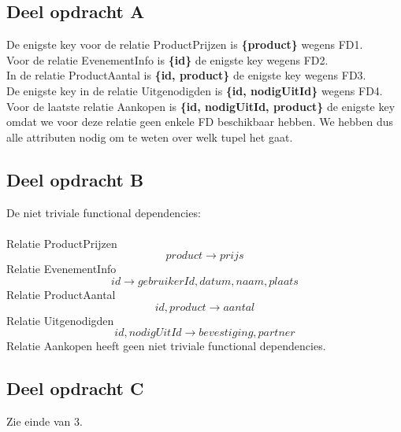 \documentclass[a4paper]{article}
\begin{document}
\subsection{Deel opdracht A}
De enigste key voor de relatie ProductPrijzen is \textbf{\{product\}} wegens FD1.\\
Voor de relatie EvenementInfo is \textbf{\{id\}} de enigste key wegens FD2.\\
In de relatie ProductAantal is \textbf{\{id, product\}} de enigste key wegens FD3.\\
De enigste key in de relatie Uitgenodigden is \textbf{\{id, nodigUitId\}} wegens FD4.\\
Voor de laatste relatie Aankopen is \textbf{\{id, nodigUitId, product\}} de enigste key omdat we voor deze relatie geen enkele FD beschikbaar hebben. We hebben dus alle attributen nodig om te weten over welk tupel het gaat.
\subsection{Deel opdracht B}
De niet triviale functional dependencies:\\\\Relatie ProductPrijzen \[product\rightarrow prijs\]
Relatie EvenementInfo\[id\rightarrow gebruikerId, datum, naam, plaats\]
Relatie ProductAantal\[id, product\rightarrow aantal\]
Relatie Uitgenodigden\[id, nodigUitId\rightarrow bevestiging, partner\]
Relatie Aankopen heeft geen niet triviale functional dependencies.
\subsection{Deel opdracht C}
Zie einde van 3.

\newpage
\end{document}
